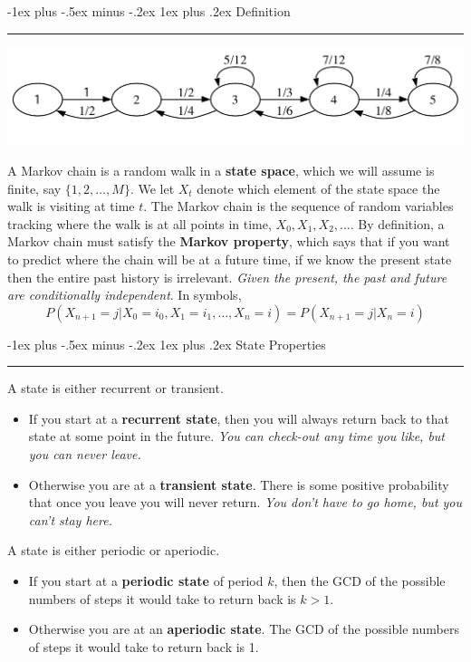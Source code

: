 \documentclass[letterpaper, 10.5pt,landscape]{article}
\makeatletter
\renewcommand{\subsubsection}{\@startsection{subsubsection}{3}{0mm}%
                                {-1ex plus -.5ex minus -.2ex}%
                                {1ex plus .2ex}%
                                {\normalfont\small\bfseries}}
\makeatother
\begin{document}
\begin{multicols*}{3}
\subsubsection{Definition} {\color{teal}\hrule height 0.5pt} \smallskip

\begin{center}
    \begin{minipage}{\linewidth}
    \includegraphics[width=\textwidth]{figures/chainA.pdf}
    \end{minipage}
\end{center}

A Markov chain is a random walk in a \textbf{state space}, which we will assume is finite, say $\{1, 2, \dots, M\}$. We let $X_t$ denote which element of the state space the walk is visiting at time $t$. The Markov chain is the sequence of random variables tracking where the walk is at all points in time, $X_0, X_1, X_2, \dots$. By definition, a Markov chain must satisfy the \textbf{Markov property}, which says that if you want to predict where the chain will be at a future time, if we know the present state then the entire past history is irrelevant.  \emph{Given the present, the past and future are conditionally independent}. In symbols,
\[P(X_{n+1} = j | X_0 = i_0, X_1 = i_1, \dots, X_n = i) = P(X_{n+1} = j | X_n = i)\]


\subsubsection{State Properties}{\color{teal}\hrule height 0.5pt} \smallskip
A state is either recurrent or transient.
\begin{itemize}
\item If you start at a \textbf{recurrent state}, then you will always return back to that state at some point in the future.  \textmusicalnote \emph{You can check-out any time you like, but you can never leave.}  \textmusicalnote
\item Otherwise you are at a \textbf{transient state}. There is some positive probability that once you leave you will never return. \textmusicalnote \emph{You don't have to go home, but you can't stay here.} \textmusicalnote
\end{itemize}
A state is either periodic or aperiodic.
\begin{itemize}
\item If you start at a \textbf{periodic state} of period $k$, then the GCD of  the possible numbers of steps it would take to return back is  $k>1$.
\item Otherwise you are at an \textbf{aperiodic state}. The GCD of  the possible numbers of steps it would take to return back is 1.
\end{itemize}



\end{multicols*}
\end{document}
